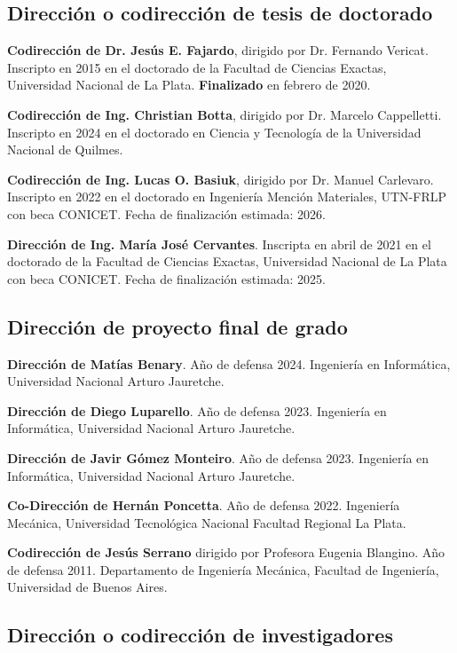 \documentclass[margin,line]{res}
\begin{document}
\begin{resume}
\subsection{ Dirección o codirección de tesis de doctorado}

{\bf Codirección de Dr. Jesús E. Fajardo}, dirigido por Dr. Fernando Vericat. Inscripto en 2015 en el doctorado de la Facultad de Ciencias Exactas, Universidad Nacional de La Plata. {\bf Finalizado} en febrero de 2020.

{\bf Codirección de Ing. Christian Botta}, dirigido por Dr. Marcelo Cappelletti. Inscripto en 2024 en el doctorado en Ciencia y Tecnología de la Universidad Nacional de Quilmes.

{\bf Codirección de Ing. Lucas O. Basiuk}, dirigido por Dr. Manuel Carlevaro. Inscripto en 2022 en el doctorado en Ingeniería Mención Materiales, UTN-FRLP con beca CONICET. Fecha de finalización estimada: 2026.

{\bf Dirección de Ing. María José Cervantes}. Inscripta en abril de 2021 en el doctorado de la Facultad de Ciencias Exactas, Universidad Nacional de La Plata con beca CONICET. Fecha de finalización estimada: 2025.

\subsection{ Dirección de proyecto final de grado}

{\bf Dirección de Matías Benary}. Año de defensa 2024. Ingeniería en Informática, Universidad Nacional Arturo Jauretche.

{\bf Dirección de Diego Luparello}. Año de defensa 2023. Ingeniería en Informática, Universidad Nacional Arturo Jauretche.

{\bf Dirección de Javir Gómez Monteiro}. Año de defensa 2023. Ingeniería en Informática, Universidad Nacional Arturo Jauretche.

{\bf Co-Dirección de Hernán Poncetta}. Año de defensa 2022. Ingeniería Mecánica, Universidad Tecnológica Nacional Facultad Regional La Plata.

{\bf Codirección de Jesús Serrano} dirigido por Profesora Eugenia Blangino. Año de defensa 2011. Departamento de Ingeniería Mecánica, Facultad de Ingeniería, Universidad de Buenos Aires.

\subsection{  Dirección o codirección de investigadores}


\end{resume}
\end{document}
